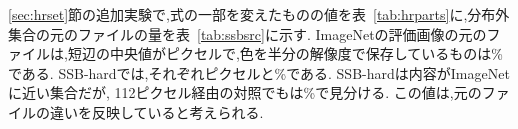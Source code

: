 \ref{sec:hrset}節の追加実験で,式の一部を変えたものの値を表~\ref{tab:hrparts}に,分布外集合の元のファイルの量を表~\ref{tab:ssbsrc}に示す. ImageNetの評価画像の元のファイルは,短辺の中央値が\olInShort{}ピクセルで,色を半分の解像度で保存しているものは\olInShare\%である. SSB-hardでは,それぞれ\olSsbShort{}ピクセルと\olSsbShare\%である. SSB-hardは内容がImageNetに近い集合だが, 112ピクセル経由の対照でも\Ours{}は\olHdOLSsb\%で見分ける. この値は,元のファイルの違いを反映していると考えられる.
